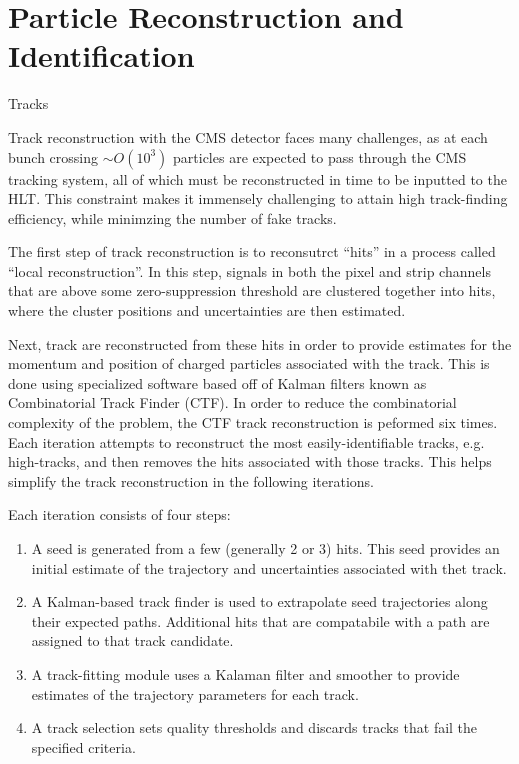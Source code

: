 \chapter{Particle Reconstruction and Identification}
\label{chap:reco_id}
\begin{section}{Tracks}

Track reconstruction with the CMS detector faces many challenges, as at each bunch crossing $\sim O(10^3)$ particles are expected to pass through the CMS tracking system, all of which must be reconstructed in time to be inputted to the HLT.
This constraint makes it immensely challenging to attain high track-finding efficiency, while minimzing the number of fake tracks.

The first step of track reconstruction is to reconsutrct ``hits'' in a process called ``local reconstruction''.
In this step, signals in both the pixel and strip channels that are above some zero-suppression threshold are clustered together into hits, where the cluster positions and uncertainties are then estimated.

Next, track are reconstructed from these hits in order to provide estimates for the momentum and position of charged particles associated with the track.
This is done using specialized software based off of Kalman filters known as Combinatorial Track Finder (CTF).
In order to reduce the combinatorial complexity of the problem, the CTF track reconstruction is peformed six times. 
Each iteration attempts to reconstruct the most easily-identifiable tracks, e.g. high-\pT tracks, and then removes the hits associated with those tracks.
This helps simplify the track reconstruction in the following iterations.

Each iteration consists of four steps:
\begin{enumerate}
\item A seed is generated from a few (generally 2 or 3) hits. 
This seed provides an initial estimate of the trajectory and uncertainties associated with thet track.
\item A Kalman-based track finder is used to extrapolate seed trajectories along their expected paths. Additional hits that are compatabile with a path are assigned to that track candidate.
\item A track-fitting module uses a Kalaman filter and smoother to provide estimates of the trajectory parameters for each track.
\item A track selection sets quality thresholds and discards tracks that fail the specified criteria.
\end{enumerate}


\end{section}
